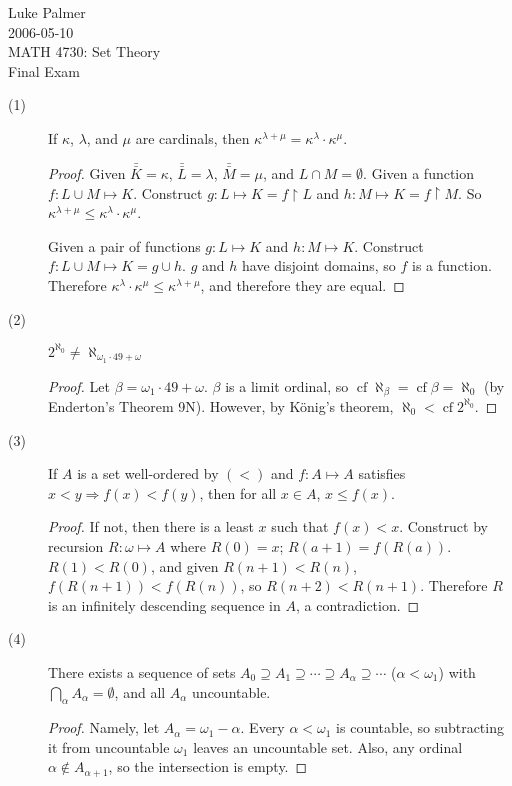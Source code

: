 \documentclass[12pt]{article}
\DeclareMathOperator{\cf}{cf}
\newcommand{\card}[1]{\bar{\bar{#1}}}
\begin{document}
\noindent Luke Palmer \\
2006-05-10 \\
MATH 4730: Set Theory \\
Final Exam

\begin{description}
\item[(1)]
  If $\kappa$, $\lambda$, and $\mu$ are cardinals, then $\kappa^{\lambda
  + \mu} = \kappa^\lambda \cdot \kappa^\mu$.
  \begin{proof}
	Given $\card{K} = \kappa$, $\card{L} = \lambda$, $\card{M} = \mu$,
	and $L \cap M = \emptyset$.  Given a function $f: L \cup M \mapsto
	K$.  Construct $g: L \mapsto K = f \upharpoonright L$ and $h: M
	\mapsto K = f \upharpoonright M$.  So $\kappa^{\lambda + \mu} \le
	\kappa^\lambda \cdot \kappa^\mu$.

	Given a pair of functions $g: L \mapsto K$ and $h: M \mapsto K$.
	Construct $f: L \cup M \mapsto K = g \cup h$.  $g$ and $h$ have
	disjoint domains, so $f$ is a function.  Therefore $\kappa^\lambda
	\cdot \kappa^\mu \le \kappa^{\lambda + \mu}$, and therefore they are
	equal.
  \end{proof}

\item[(2)]
  $2^{\aleph_0} \neq \aleph_{\omega_1 \cdot 49 + \omega}$
  \begin{proof} 
    Let $\beta = \omega_1 \cdot 49 + \omega$.  $\beta$ is a limit ordinal, 
	so $\cf{\aleph_\beta} = \cf{\beta} = \aleph_0$ (by Enderton's
	Theorem 9N).  However, by K\"onig's theorem, $\aleph_0 <
	\cf{2^{\aleph_0}}$.
  \end{proof}

\item[(3)]
  If $A$ is a set well-ordered by $(<)$ and $f:A \mapsto A$ satisfies $x
  < y \Rightarrow f(x) < f(y)$, then for all $x \in A$, $x \le f(x)$.
  \begin{proof}
	If not, then there is a least $x$ such that $f(x) < x$.  Construct
	by recursion $R:\omega \mapsto A$ where $R(0) = x$; $R(a+1) =
	f(R(a))$.  $R(1) < R(0)$, and given $R(n+1) < R(n)$, $f(R(n+1)) <
	f(R(n))$, so $R(n+2) < R(n+1)$.  Therefore $R$ is an infinitely
	descending sequence in $A$, a contradiction.
  \end{proof}

\item[(4)]
  There exists a sequence of sets $A_0 \supseteq A_1 \supseteq \cdots \supseteq
  A_\alpha \supseteq \cdots$ ($\alpha < \omega_1$) with
  $\bigcap\limits_{\alpha}{A_\alpha} = \emptyset$, and all $A_\alpha$
  uncountable.  
  \begin{proof}
    Namely, let $A_\alpha = \omega_1 - \alpha$.  Every
    $\alpha < \omega_1$ is countable, so subtracting it from uncountable
    $\omega_1$ leaves an uncountable set.  Also, any ordinal $\alpha
    \notin A_{\alpha+1}$, so the intersection is empty.
  \end{proof}
  

\end{description}
\end{document}
